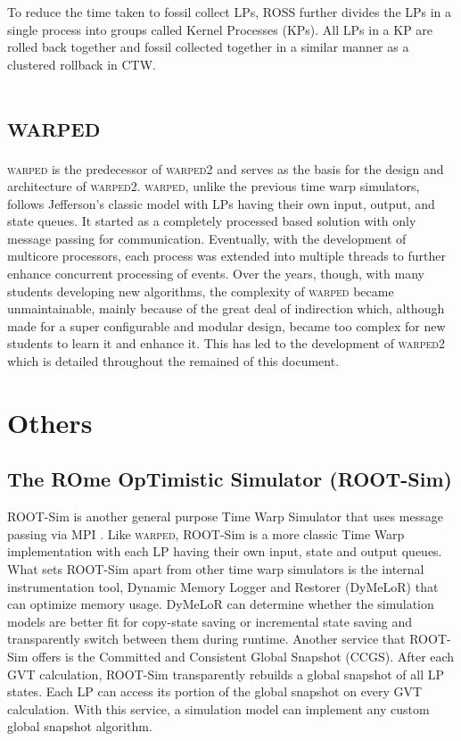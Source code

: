 \documentclass[11pt]{book}
\begin{document}
To reduce the time taken to fossil collect LPs, ROSS further divides the LPs in a single process
into groups called Kernel Processes (KPs). All LPs in a KP are rolled back together and fossil
collected together in a similar manner as a clustered rollback in CTW.

\section{\textsc{warped}}

\textsc{warped} is the predecessor of \textsc{warped2} and serves as the basis for the design
and architecture of \textsc{warped2}. \textsc{warped}, unlike the previous time warp simulators,
follows Jefferson's classic model with LPs having their own input, output, and state queues. It
started as a completely processed based solution with only message passing for communication.
Eventually, with the development of multicore processors, each process was extended into multiple
threads to further enhance concurrent processing of events. Over the years, though, with many
students developing new algorithms, the complexity of \textsc{warped} became unmaintainable, mainly
because of the great deal of indirection which, although made for a super configurable and modular
design, became too complex for new students to learn it and enhance it. This has led to the
development of \textsc{warped2} which is detailed throughout the remained of this document.

\section{Others}

\subsection{The ROme OpTimistic Simulator (ROOT-Sim)}

ROOT-Sim is another general purpose Time Warp Simulator that uses message passing via MPI
\cite{pellegrini-11}. Like \textsc{warped}, ROOT-Sim is a more classic Time Warp
implementation with each LP having their own input, state and output queues. What sets
ROOT-Sim apart from other time warp simulators is the internal instrumentation tool, Dynamic
Memory Logger and Restorer (DyMeLoR) that can optimize memory usage. DyMeLoR can determine
whether the simulation models are better fit for copy-state saving or incremental state
saving and transparently switch between them during runtime. Another service that ROOT-Sim
offers is the Committed and Consistent Global Snapshot (CCGS). After each GVT calculation,
ROOT-Sim transparently rebuilds a global snapshot of all LP states. Each LP can access its
portion of the global snapshot on every GVT calculation. With this service, a simulation
model can implement any custom global snapshot algorithm.
\end{document}
